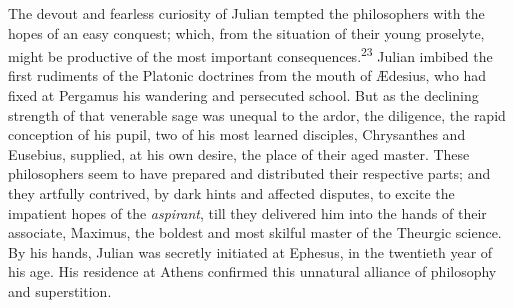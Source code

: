 The devout and fearless curiosity of Julian tempted the
philosophers with the hopes of an easy conquest; which, from the
situation of their young proselyte, might be productive of the
most important consequences.\textsuperscript{23} Julian imbibed the first
rudiments of the Platonic doctrines from the mouth of Ædesius,
who had fixed at Pergamus his wandering and persecuted school.
But as the declining strength of that venerable sage was unequal
to the ardor, the diligence, the rapid conception of his pupil,
two of his most learned disciples, Chrysanthes and Eusebius,
supplied, at his own desire, the place of their aged master.
These philosophers seem to have prepared and distributed their
respective parts; and they artfully contrived, by dark hints and
affected disputes, to excite the impatient hopes of the
\textit{aspirant}, till they delivered him into the hands of their
associate, Maximus, the boldest and most skilful master of the
Theurgic science. By his hands, Julian was secretly initiated at
Ephesus, in the twentieth year of his age. His residence at
Athens confirmed this unnatural alliance of philosophy and
superstition.

